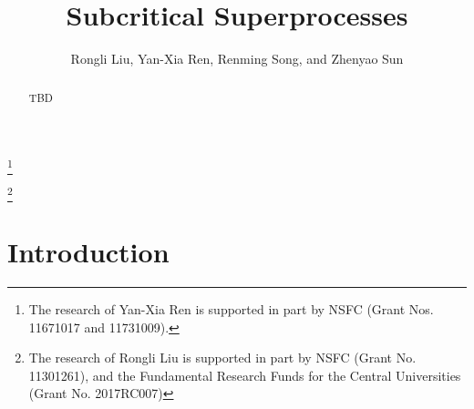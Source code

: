 \documentclass[12pt,a4paper]{amsart}
\numberwithin{equation}{section}
\theoremstyle{plain}
\theoremstyle{definition}
\theoremstyle{remark}
\newcounter{N}
\newcounter{n}[N]
\begin{document}
\title {Subcritical Superprocesses }
\author[R. Liu, Y.-X. Ren, R. Song, and Z. Sun]{Rongli Liu, Yan-Xia Ren, Renming Song, and Zhenyao Sun}
\address{Yan-Xia Ren\\ School of Mathematical Sciences\\ Peking University\\ Beijing 100871\\ P. R. China}
\thanks{The research of Yan-Xia Ren is supported in part by NSFC (Grant Nos. 11671017 and 11731009).}
\address{Rongli Liu\\ Mathematics and Applied Mathematics\\ Beijing jiaotong University\\ Beijing 100044\\ P. R. China}
\thanks{The research of Rongli Liu is supported in part by NSFC (Grant No. 11301261), and the Fundamental Research Funds for the Central Universities (Grant No.  2017RC007)}
\address{Renming Song\\ Department of Mathematics\\ University of Illinois at Urbana-Champaign \\ Urbana \\ IL 61801\\ USA}
\address{Zhenyao Sun\\ Faculty of Industrial Engineering and Management \\ Technion, Isreal Institute of Technology \\ Haifa 3200003\\ Isreal}
\begin{abstract}
TBD
\end{abstract}
\maketitle
\section{Introduction}
\end{document}
